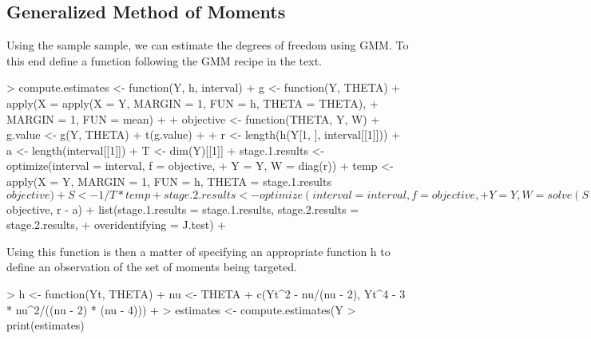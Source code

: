 \subsection{Generalized Method of Moments}
Using the sample sample, we can estimate the degrees of freedom using GMM.  To this end define a
function following the GMM recipe in the text.  
\begin{Schunk}
\begin{Sinput}
> compute.estimates <- function(Y, h, interval) {
+     g <- function(Y, THETA) {
+         apply(X = apply(X = Y, MARGIN = 1, FUN = h, THETA = THETA), 
+             MARGIN = 1, FUN = mean)
+     }
+     objective <- function(THETA, Y, W) {
+         g.value <- g(Y, THETA)
+         t(g.value) %*% W %*% g.value
+     }
+     r <- length(h(Y[1, ], interval[[1]]))
+     a <- length(interval[[1]])
+     T <- dim(Y)[[1]]
+     stage.1.results <- optimize(interval = interval, f = objective, 
+         Y = Y, W = diag(r))
+     temp <- apply(X = Y, MARGIN = 1, FUN = h, THETA = stage.1.results$objective)
+     S <- 1/T * temp %*% t(temp)
+     stage.2.results <- optimize(interval = interval, f = objective, 
+         Y = Y, W = solve(S))
+     J.test <- 1 - pchisq(T * stage.2.results$objective, r - a)
+     list(stage.1.results = stage.1.results, stage.2.results = stage.2.results, 
+         overidentifying = J.test)
+ }
\end{Sinput}
\end{Schunk}
Using this function is then a matter of specifying an appropriate function h to define an observation of
the set of moments being targeted.
\begin{Schunk}
\begin{Sinput}
> h <- function(Yt, THETA) {
+     nu <- THETA
+     c(Yt^2 - nu/(nu - 2), Yt^4 - 3 * nu^2/((nu - 2) * (nu - 4)))
+ }
> estimates <- compute.estimates(Y %o% 1, h, interval = c(5, 30))
> print(estimates)
\end{Sinput}
\end{Schunk}
